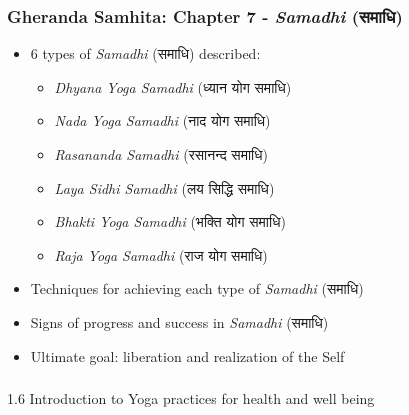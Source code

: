 \begin{frame}[fragile]\frametitle{Gheranda Samhita: Chapter 7 - \textit{Samadhi} (समाधि)}
\begin{itemize}
    \item 6 types of \textit{Samadhi} (समाधि) described:
    \begin{itemize}
        \item \textit{Dhyana Yoga Samadhi} (ध्यान योग समाधि)
        \item \textit{Nada Yoga Samadhi} (नाद योग समाधि)
        \item \textit{Rasananda Samadhi} (रसानन्द समाधि)
        \item \textit{Laya Sidhi Samadhi} (लय सिद्धि समाधि)
        \item \textit{Bhakti Yoga Samadhi} (भक्ति योग समाधि)
        \item \textit{Raja Yoga Samadhi} (राज योग समाधि)
    \end{itemize}
    \item Techniques for achieving each type of \textit{Samadhi} (समाधि)
    \item Signs of progress and success in \textit{Samadhi} (समाधि)
    \item Ultimate goal: liberation and realization of the Self
\end{itemize}
\end{frame}


\begin{frame}[fragile]\frametitle{}
\begin{center}
{\Large 1.6 Introduction to Yoga practices for health and well being}
\end{center}
\end{frame}


